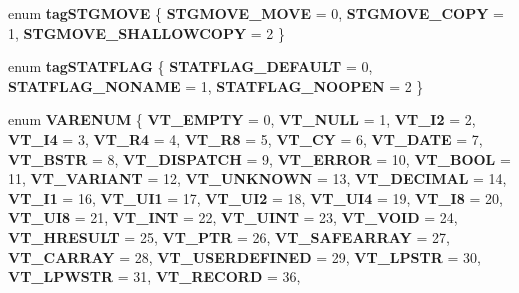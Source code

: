 \begin{DoxyCompactItemize}
enum {\bfseries tag\+S\+T\+G\+M\+O\+VE} \{ {\bfseries S\+T\+G\+M\+O\+V\+E\+\_\+\+M\+O\+VE} = 0, 
{\bfseries S\+T\+G\+M\+O\+V\+E\+\_\+\+C\+O\+PY} = 1, 
{\bfseries S\+T\+G\+M\+O\+V\+E\+\_\+\+S\+H\+A\+L\+L\+O\+W\+C\+O\+PY} = 2
 \}
\item 
\mbox{\label{interface_i_win_types_ad6a1b59a885b53071089b8fcae1925c4}} 
enum {\bfseries tag\+S\+T\+A\+T\+F\+L\+AG} \{ {\bfseries S\+T\+A\+T\+F\+L\+A\+G\+\_\+\+D\+E\+F\+A\+U\+LT} = 0, 
{\bfseries S\+T\+A\+T\+F\+L\+A\+G\+\_\+\+N\+O\+N\+A\+ME} = 1, 
{\bfseries S\+T\+A\+T\+F\+L\+A\+G\+\_\+\+N\+O\+O\+P\+EN} = 2
 \}
\item 
\mbox{\label{interface_i_win_types_a2e3c43d0fd75008e072a24c7b56bcc9d}} 
enum {\bfseries V\+A\+R\+E\+N\+UM} \{ \newline
{\bfseries V\+T\+\_\+\+E\+M\+P\+TY} = 0, 
{\bfseries V\+T\+\_\+\+N\+U\+LL} = 1, 
{\bfseries V\+T\+\_\+\+I2} = 2, 
{\bfseries V\+T\+\_\+\+I4} = 3, 
\newline
{\bfseries V\+T\+\_\+\+R4} = 4, 
{\bfseries V\+T\+\_\+\+R8} = 5, 
{\bfseries V\+T\+\_\+\+CY} = 6, 
{\bfseries V\+T\+\_\+\+D\+A\+TE} = 7, 
\newline
{\bfseries V\+T\+\_\+\+B\+S\+TR} = 8, 
{\bfseries V\+T\+\_\+\+D\+I\+S\+P\+A\+T\+CH} = 9, 
{\bfseries V\+T\+\_\+\+E\+R\+R\+OR} = 10, 
{\bfseries V\+T\+\_\+\+B\+O\+OL} = 11, 
\newline
{\bfseries V\+T\+\_\+\+V\+A\+R\+I\+A\+NT} = 12, 
{\bfseries V\+T\+\_\+\+U\+N\+K\+N\+O\+WN} = 13, 
{\bfseries V\+T\+\_\+\+D\+E\+C\+I\+M\+AL} = 14, 
{\bfseries V\+T\+\_\+\+I1} = 16, 
\newline
{\bfseries V\+T\+\_\+\+U\+I1} = 17, 
{\bfseries V\+T\+\_\+\+U\+I2} = 18, 
{\bfseries V\+T\+\_\+\+U\+I4} = 19, 
{\bfseries V\+T\+\_\+\+I8} = 20, 
\newline
{\bfseries V\+T\+\_\+\+U\+I8} = 21, 
{\bfseries V\+T\+\_\+\+I\+NT} = 22, 
{\bfseries V\+T\+\_\+\+U\+I\+NT} = 23, 
{\bfseries V\+T\+\_\+\+V\+O\+ID} = 24, 
\newline
{\bfseries V\+T\+\_\+\+H\+R\+E\+S\+U\+LT} = 25, 
{\bfseries V\+T\+\_\+\+P\+TR} = 26, 
{\bfseries V\+T\+\_\+\+S\+A\+F\+E\+A\+R\+R\+AY} = 27, 
{\bfseries V\+T\+\_\+\+C\+A\+R\+R\+AY} = 28, 
\newline
{\bfseries V\+T\+\_\+\+U\+S\+E\+R\+D\+E\+F\+I\+N\+ED} = 29, 
{\bfseries V\+T\+\_\+\+L\+P\+S\+TR} = 30, 
{\bfseries V\+T\+\_\+\+L\+P\+W\+S\+TR} = 31, 
{\bfseries V\+T\+\_\+\+R\+E\+C\+O\+RD} = 36, 
\newline

\end{DoxyCompactItemize}
